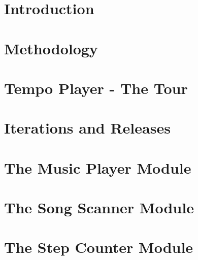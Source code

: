 



\frontmatter 

\cleardoublepage

\cleardoublepage

\cleardoublepage


\mainmatter



\chapter{Introduction}
\label{chap:intro}


\chapter{Methodology}
\label{chap:methodology}


\chapter{Tempo Player - The Tour}
\label{chap:tempoPlayer}


\chapter{Iterations and Releases}
\label{chap:iteration}


\chapter{The Music Player Module}
\label{chap:musicPlayer}


\chapter{The Song Scanner Module}
\label{chap:songScanner}


\chapter{The Step Counter Module}
\label{chap:stepCounter}


